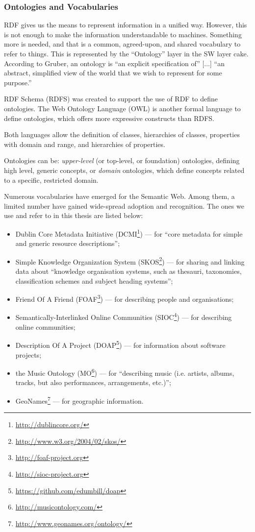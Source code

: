 \subsubsection{Ontologies and Vocabularies}

RDF gives us the means to represent information in a unified way. However, this is not enough to make the information understandable to machines. Something more is needed, and that is a common, agreed-upon, and shared vocabulary to refer to things. This is represented by the ``Ontology'' layer in the SW layer cake. According to Gruber, an ontology is ``an explicit specification of'' [...] ``an abstract, simplified view of the world that we wish to represent for some purpose.'' \cite{Gruber1993}

RDF Schema (RDFS) \cite{Brickley2004} was created to support the use of RDF to define ontologies. The Web Ontology Language (OWL) is another formal language to define ontologies, which offers more expressive constructs than RDFS.

Both languages allow the definition of classes, hierarchies of classes, properties with domain and range, and hierarchies of properties. 

Ontologies can be: \emph{upper-level} (or top-level, or foundation) ontologies, defining high level, generic concepts, or \emph{domain} ontologies, which define concepts related to a specific, restricted domain.

Numerous vocabularies have emerged for the Semantic Web. Among them, a limited number have gained wide-spread adoption and recognition. The ones we use and refer to in this thesis are listed below:
\begin{itemize}
 \item Dublin Core Metadata Initiative (DCMI\footnote{\url{http://dublincore.org/}}) \cite{Nilsson2008} --- for ``core metadata for simple and generic resource descriptions'';
 \item Simple Knowledge Organization System (SKOS\footnote{\url{http://www.w3.org/2004/02/skos/}}) \cite{Miles2009} --- for sharing and linking data about ``knowledge organisation systems, such as thesauri, taxonomies, classification schemes and subject heading systems'';
 \item Friend Of A Friend (FOAF\footnote{\url{http://foaf-project.org}}) \cite{Brickley2005} --- for describing people and organisations;
 \item Semantically-Interlinked Online Communities (SIOC\footnote{\url{http://sioc-project.org}}) \cite{Breslin2005} --- for describing online communities; 
 \item Description Of A Project (DOAP\footnote{\url{https://github.com/edumbill/doap}}) --- for information about software projects;
 \item the Music Ontology (MO\footnote{\url{http://musicontology.com/}}) --- for ``describing music (i.e. artists, albums, tracks, but also performances, arrangements, etc.)'';
 \item GeoNames\footnote{\url{http://www.geonames.org/ontology/}} --- for geographic information.
\end{itemize}

